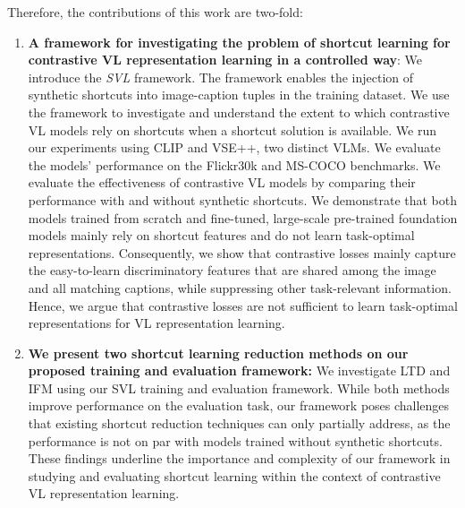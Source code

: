 Therefore, the contributions of this work are two-fold: 
\begin{enumerate}[label=\Roman*]
	\item \textbf{A framework for investigating the problem of shortcut learning for contrastive \acl{VL} representation learning in a controlled way}:
	We introduce the \textit{\acl{SVL}} framework.
	The framework enables the injection of synthetic shortcuts into image-caption tuples in the training dataset. 
	We use the framework to investigate and understand the extent to which contrastive \ac{VL} models rely on shortcuts when a shortcut solution is available. 
	We run our experiments using CLIP and VSE++, two distinct \acp{VLM}. We evaluate the models' performance on the \ac{Flickr30k} and \ac{MS-COCO} benchmarks.
	We evaluate the effectiveness of contrastive \ac{VL} models by comparing their performance with and without synthetic shortcuts.
	We demonstrate that both models trained from scratch and fine-tuned, large-scale pre-trained foundation models mainly rely on shortcut features and do not learn task-optimal representations.
	Consequently, we show that contrastive losses mainly capture the easy-to-learn discriminatory features that are shared among the image and all matching captions, while suppressing other task-relevant information. 
	Hence, we argue that contrastive losses are not sufficient to learn task-optimal representations for \ac{VL} representation learning.
	\item \textbf{We present two shortcut learning reduction methods on our proposed training and evaluation framework:}  We investigate \acf{LTD} and \acf{IFM} using our \ac{SVL} training and evaluation framework. 
	While both methods improve performance on the evaluation task, our framework poses challenges that existing shortcut reduction techniques can only partially address, as the performance is not on par with models trained without synthetic shortcuts.
	These findings underline the importance and complexity of our framework in studying and evaluating shortcut learning within the context of contrastive VL representation learning.
\end{enumerate}
